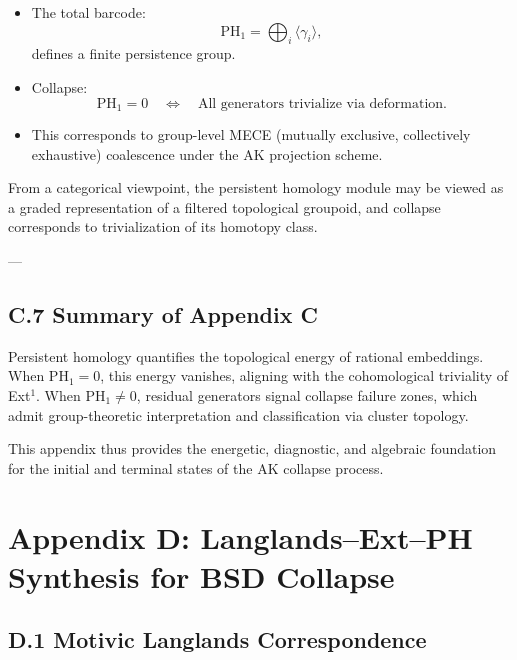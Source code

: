 \begin{itemize}
  \item The total barcode:
  \[
  \mathrm{PH}_1 = \bigoplus_i \langle \gamma_i \rangle,
  \]
  defines a finite persistence group.

  \item Collapse:
  \[
  \mathrm{PH}_1 = 0 \quad \Leftrightarrow \quad \text{All generators trivialize via deformation}.
  \]

  \item This corresponds to group-level MECE (mutually exclusive, collectively exhaustive) coalescence  
  under the AK projection scheme.
\end{itemize}

\begin{remark}
From a categorical viewpoint, the persistent homology module may be viewed  
as a graded representation of a filtered topological groupoid,  
and collapse corresponds to trivialization of its homotopy class.
\end{remark}

---

\subsection*{C.7 Summary of Appendix C}

Persistent homology quantifies the topological energy of rational embeddings.  
When \( \mathrm{PH}_1 = 0 \), this energy vanishes, aligning with the cohomological triviality of Ext$^1$.  
When \( \mathrm{PH}_1 \neq 0 \), residual generators signal collapse failure zones,  
which admit group-theoretic interpretation and classification via cluster topology.

This appendix thus provides the energetic, diagnostic, and algebraic foundation  
for the initial and terminal states of the AK collapse process.



\section*{Appendix D: Langlands--Ext--PH Synthesis for BSD Collapse}

\subsection*{D.1 Motivic Langlands Correspondence}

